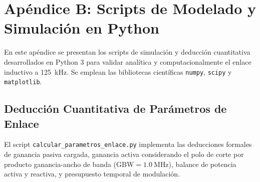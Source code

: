 \section{Apéndice B: Scripts de Modelado y Simulación en Python}
\label{sec:apendice_simulacion}

En este apéndice se presentan los scripts de simulación y deducción cuantitativa desarrollados en Python 3 para validar analítica y computacionalmente el enlace inductivo a \SI{125}{\kilo\hertz}. Se emplean las bibliotecas científicas \texttt{numpy}, \texttt{scipy} y \texttt{matplotlib}.

\subsection{Deducción Cuantitativa de Parámetros de Enlace}

El script \texttt{calcular\_parametros\_enlace.py} implementa las deducciones formales de ganancia pasiva cargada, ganancia activa considerando el polo de corte por producto ganancia-ancho de banda ($\text{GBW} = \SI{1.0}{\mega\hertz}$), balance de potencia activa y reactiva, y presupuesto temporal de modulación.

